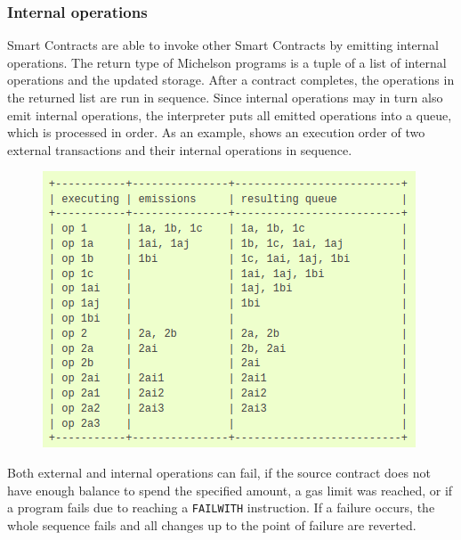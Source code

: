 \subsubsection{Internal operations}
Smart Contracts are able to invoke other Smart Contracts by emitting internal operations. The return type of Michelson programs is a tuple of a list of internal operations and the updated storage. After a contract completes, the operations in the returned list are run in sequence. Since internal operations may in turn also emit internal operations, the interpreter puts all emitted operations into a queue, which is processed in order. As an example,  shows an execution order of two external transactions and their internal operations in sequence.
\begin{figure}[h]
\centering
\includegraphics[width=0.5\linewidth]{figures/5-offline_tezos/internal_ops}
\label{fig:internal_ops}
\end{figure}

Both external and internal operations can fail, if the source contract does not have enough balance to spend the specified amount, a gas limit was reached, or if a program fails due to reaching a \texttt{FAILWITH} instruction. If a failure occurs, the whole sequence fails and all changes up to the point of failure are reverted.

